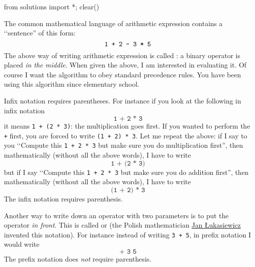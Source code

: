 \begin{python0}
from solutions import *; clear()
\end{python0}

The common mathematical language of arithmetic expression contains
a \lq\lq sentence'' of this form:
\[
\text{\texttt{1 + 2 - 3 * 5}} 
\]
The above way of writing arithmetic expression is called
: a binary operator is placed \textit{in the middle}.
When given the above, I am interested in evaluating it.
Of course I want the algorithm to obey standard precedence rules.
You have been using this algorithm since elementary school.

Infix notation requires parentheses.
For instance if you look at the following in infix notation
\[
\texttt{1 + 2 * 3}
\]
it means \verb!1 + (2 * 3)!: the multiplication goes first.
If you wanted to perform the \verb!+! first, you are forced to 
write 
\verb!(1 + 2) * 3!.
Let me repeat the above: if I
say to you \lq\lq Compute this \texttt{1 + 2 * 3} but make sure
you do multiplication first'', then mathematically
(without all the above words), I have to write
\[
\texttt{1 + (2 * 3)}
\]
but if I say
\lq\lq Compute this \texttt{1 + 2 * 3} but make sure
you do addition first'', then mathematically
(without all the above words), I have to write
\[
\texttt{(1 + 2) * 3}
\]
The infix notation requires parenthesis.

Another way to write down an operator with two parameters is to put the
operator \textit{in front}.
This is called
 or
(the Polish mathematician
\href{https://en.wikipedia.org/wiki/Jan_%C5%81ukasiewicz}{Jan \L{}ukasiewicz}
invented this notation).
For instance instead of writing \texttt{3 + 5}, in prefix notation
I would write
\[
\texttt{+ 3 5}
\]
The prefix notation does \textit{not} require parenthesis.

